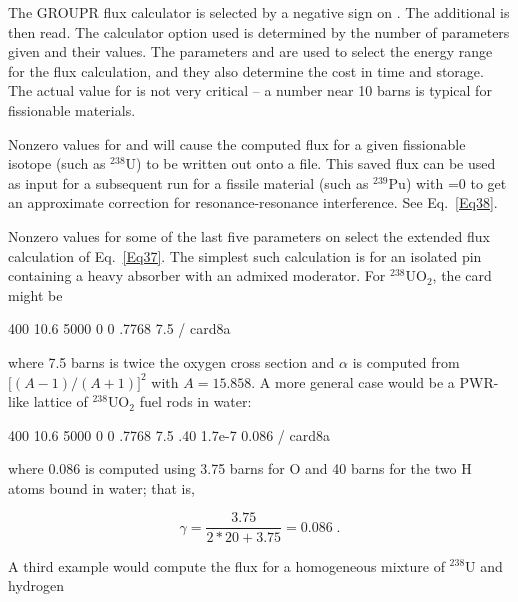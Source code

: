 The GROUPR flux calculator is selected by
a negative sign on .  The additional  is
then read.  The calculator option used is determined by the number
of parameters given and their values.  The parameters 
and  are used to select the energy range for the
flux calculation, and they also determine the cost in time
and storage.  The actual value for  is not very
critical -- a number near 10 barns is typical for fissionable materials.

Nonzero values for  and  will cause the
computed flux for a given fissionable isotope (such as $^{238}$U) to be
written out onto a file.  This saved flux can be used as input for a
subsequent run for a fissile material (such as $^{239}$Pu) with
=0 to get an approximate correction for resonance-resonance
interference.  See Eq.~\ref{Eq38}.

Nonzero values for some of the last five parameters on 
select the extended flux calculation of Eq.~\ref{Eq37}.  The simplest
such calculation is for an isolated pin containing a heavy absorber
with an admixed moderator.  For $^{238}$UO$_2$, the card might be

\small
\begin{ccode}

   400 10.6 5000 0 0 .7768 7.5 / card8a

\end{ccode}
\normalsize

\noindent
where 7.5 barns is twice the oxygen cross section and $\alpha$ is computed
from $\bigl[ (A-1)/(A+1)\bigr] ^2$ with $A=15.858$.  A more general case
would be a PWR-like lattice of $^{238}$UO$_2$ fuel rods in water:

\small
\begin{ccode}

   400 10.6 5000 0 0 .7768 7.5 .40 1.7e-7 0.086 / card8a

\end{ccode}
\normalsize

\noindent
where 0.086 is computed using 3.75 barns for O and 40 barns for the
two H atoms bound in water; that is,

\begin{equation}
  \gamma = \frac{3.75}{2*20 + 3.75}  = 0.086\;.
\end{equation}
\vspace{0.5 pt}

\noindent
A third example would compute the flux for a homogeneous mixture of
$^{238}$U and hydrogen

